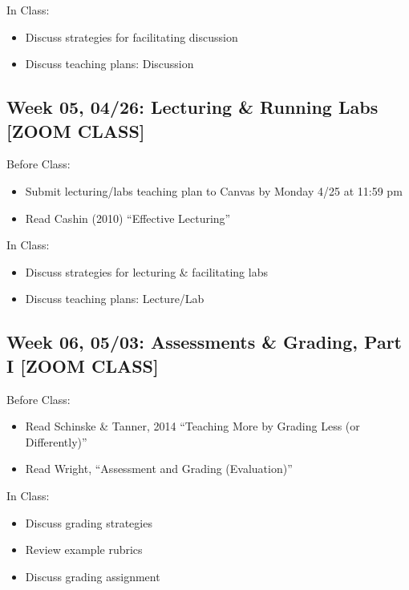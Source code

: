 \documentclass[11pt,]{article}
\providecommand{\tightlist}{%
  \setlength{\itemsep}{0pt}\setlength{\parskip}{0pt}}
\begin{document}
In Class:

\begin{itemize}
\tightlist
\item
  Discuss strategies for facilitating discussion
\item
  Discuss teaching plans: Discussion
\end{itemize}

\hypertarget{week-05-0426-lecturing-running-labs-zoom-class}{%
\subsection{Week 05, 04/26: Lecturing \& Running Labs {[}ZOOM
CLASS{]}}\label{week-05-0426-lecturing-running-labs-zoom-class}}

Before Class:

\begin{itemize}
\tightlist
\item
  Submit lecturing/labs teaching plan to Canvas by Monday 4/25 at 11:59
  pm
\item
  Read Cashin (2010) ``Effective Lecturing''
\end{itemize}

In Class:

\begin{itemize}
\tightlist
\item
  Discuss strategies for lecturing \& facilitating labs
\item
  Discuss teaching plans: Lecture/Lab
\end{itemize}

\hypertarget{week-06-0503-assessments-grading-part-i-zoom-class}{%
\subsection{Week 06, 05/03: Assessments \& Grading, Part I {[}ZOOM
CLASS{]}}\label{week-06-0503-assessments-grading-part-i-zoom-class}}

Before Class:

\begin{itemize}
\tightlist
\item
  Read Schinske \& Tanner, 2014 ``Teaching More by Grading Less (or
  Differently)''
\item
  Read Wright, ``Assessment and Grading (Evaluation)''
\end{itemize}

In Class:

\begin{itemize}
\tightlist
\item
  Discuss grading strategies
\item
  Review example rubrics
\item
  Discuss grading assignment
\end{itemize}
\end{document}
